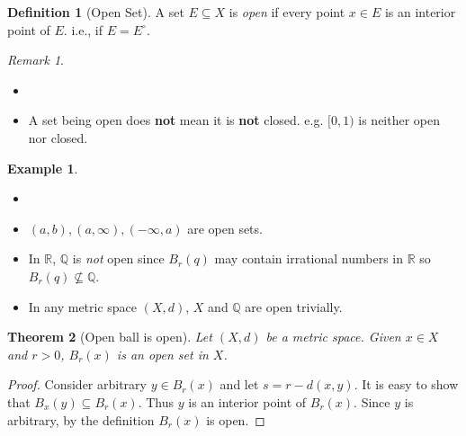 \documentclass[12pt, lettersize]{book}
\theoremstyle{plain}
\newtheorem{thm}{Theorem}[section]
\theoremstyle{definition}
\newtheorem{dfn}[thm]{Definition}
\newtheorem*{eg}{Example}
\theoremstyle{remark}
\newtheorem*{rem}{Remark}
\newcommand{\R}{\mathbb{R}}
\newcommand{\Q}{\mathbb{Q}}
\begin{document}
	\begin{dfn}[Open Set]
		A set $E\subseteq X$ is \emph{open} if every point $x\in E$ is an interior point of $E$. i.e., if $E=E^\circ$.	
	\end{dfn}
	\begin{rem}
		\begin{itemize}
			\item[]
			
			\item A set being open does \textbf{not} mean it is \textbf{not} closed. e.g. $[0,1)$ is neither open nor closed.
		\end{itemize}
	\end{rem}
	\begin{eg}
		\begin{itemize}
			\item[]
			\item $(a,b),(a,\infty),(-\infty,a)$ are open sets.
			\item In $\R$, $\Q$ is \emph{not} open since $B_r(q)$ may contain irrational numbers in $\R$ so $B_r(q)\nsubseteq\Q$.
			\item In any metric space $(X,d)$, $X$ and $\Q$ are open trivially.
		\end{itemize}
	\end{eg}
	
	\begin{thm}[Open ball is open]
		Let $(X,d)$ be a metric space. Given $x\in X$ and $r>0$, $B_r(x)$ is an open set in $X$.
	\end{thm}
	\begin{proof}
		Consider arbitrary $y\in B_r(x)$ and let $s=r-d(x,y)$. It is easy to show that $B_x(y)\subseteq B_r(x)$. Thus $y$ is an interior point of $B_r(x)$. Since $y$ is arbitrary, by the definition $B_r(x)$ is open.
	\end{proof}
	
\end{document}
